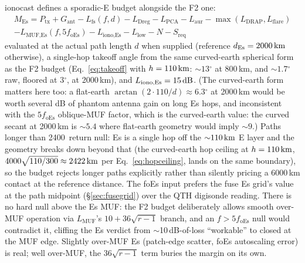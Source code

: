 \documentclass[11pt,a4paper]{article}
\newcommand{\SI}[2]{#1\,\text{#2}}
\newcommand{\dB}{\text{dB}}
\newcommand{\km}{\text{km}}
\newcommand{\degree}{\ensuremath{{}^\circ}}
\begin{document}
ionocast defines a sporadic-E budget alongside the F2 one:
\begin{equation}\label{eq:esmargin}
\begin{split}
  M_{\text{Es}} = P_{\text{tx}} + G_{\text{ant}}
    - L_{\text{fs}}(f, d)
    - L_{\text{Dreg}} - L_{\text{PCA}} - L_{\text{aur}}
    - \max(L_{\text{DRAP}}, L_{\text{flare}}) \\
    - L_{\text{MUF,Es}}(f, 5 f_{\text{oEs}})
    - L_{\text{iono,Es}} - L_{\text{low}}
    - N - S_{\text{req}}
\end{split}
\end{equation}
evaluated at the actual path length $d$ when supplied (reference
$d_{\text{Es}} = \SI{2000}{\km}$ otherwise), a single-hop takeoff
angle from the same curved-earth spherical form as the F2 budget
(Eq.~\ref{eq:takeoff} with $h = \SI{110}{\km}$: ${\sim}13\degree$
at 800\,km, and ${\sim}1.7\degree$ raw, floored at $3\degree$,
at 2000\,km), and $L_{\text{iono,Es}} = \SI{15}{\dB}$.
(The curved-earth form matters here too: a
flat-earth $\arctan(2 \cdot 110/d) \approx 6.3\degree$ at
2000\,km would be worth several dB of phantom antenna gain on
long Es
hops, and inconsistent with the $5 f_{\text{oEs}}$ oblique-MUF
factor, which is the curved-earth value: the curved secant at
2000\,km is ${\sim}5.4$ where flat-earth geometry would imply
${\sim}9$.)  Paths longer
than \SI{2400}{\km} return null: Es is a single hop off the
${\sim}\SI{110}{\km}$ E layer and the geometry breaks down beyond
that (the curved-earth hop ceiling at $h = \SI{110}{\km}$,
$4000\sqrt{110/300} \approx \SI{2422}{\km}$ per
Eq.~\ref{eq:hopceiling}, lands on the same boundary), so the
budget rejects longer paths explicitly rather than
silently pricing a 6000\,km contact at the reference distance.
The foEs input prefers the fuse Es grid's value at the path
midpoint (\S\ref{sec:fusegrid}) over the QTH digisonde reading.
There is no hard null above the Es MUF: the
F2 budget deliberately allows smooth over-MUF operation via
$L_{\text{MUF}}$'s $10 + 36\sqrt{r-1}$ branch, and an
$f > 5 f_{\text{oEs}}$ null would contradict it, cliffing the Es
verdict from ${\sim}$10\,dB-of-loss ``workable'' to closed at the
MUF edge.  Slightly over-MUF Es (patch-edge scatter, foEs
autoscaling error) is real; well over-MUF, the $36\sqrt{r-1}$
term buries the margin on its own.
\end{document}
